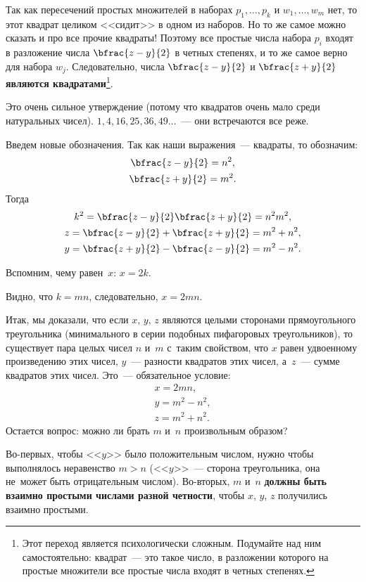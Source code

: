 Так как пересечений простых множителей в наборах $p_1,\dots,p_k$ и $w_1,\dots,w_m$ нет,
то этот квадрат целиком <<сидит>> в одном из наборов. Но то же самое можно сказать и про все прочие
квадраты! Поэтому все простые числа набора $p_i$ входят в разложение числа $\bfrac{z-y}{2}$ в четных
степенях, и то же самое верно для набора $w_j$. Следовательно, числа $\bfrac{z-y}{2}$ и
$\bfrac{z+y}{2}$ \textbf{являются квадратами}\footnote{Этот переход является психологически
сложным. Подумайте над ним самостоятельно: квадрат~--- это такое число, в разложении которого на
простые множители все простые числа входят в четных степенях.}.

Это очень сильное утверждение (потому что квадратов очень мало среди натуральных чисел). $1, 4, 16, 25, 36, 49 \ldots$~---
они встречаются все реже.

Введем новые обозначения. Так как наши выражения~--- квадраты, то обозначим:
\begin{gather*}
\bfrac{z-y}{2}=n^{2},\\
\bfrac{z+y}{2}=m^{2}.
\end{gather*}
Тогда
\begin{gather*}
k^{2}=\bfrac{z-y}{2}\bfrac{z+y}{2}=n^{2}m^{2},\\
z=\bfrac{z-y}{2}+\bfrac{z+y}{2}=m^{2}+n^{2},\\
y=\bfrac{z+y}{2}-\bfrac{z-y}{2}=m^{2}-n^{2}.
\end{gather*}

Вспомним, чему равен~$x$: $x=2k$.

Видно, что $k=mn$, следовательно, $x=2mn$.

Итак, мы доказали, что если $x$, $y$, $z$ являются целыми сторонами прямоугольного треугольника (минимального в серии подобных пифагоровых треугольников), то
существует пара целых чисел $n$ и~$m$ с~таким свойством, что $x$ равен удвоенному произведению этих
чисел, $y$~--- разности квадратов этих чисел, а~$z$~--- сумме квадратов этих чисел. Это~---
обязательное условие:
\begin{gather*}
x=2mn,\\
y=m^{2}-n^{2},\\
z=m^{2}+n^{2}.
\end{gather*}
Остается вопрос: можно ли брать $m$ и~$n$ произвольным образом?

Во-первых, чтобы <<$y$>> было положительным числом, нужно чтобы выполнялось неравенство $m>n$ (<<$y$>>~--- сторона
треугольника, она не~может быть отрицательным числом). Во-вторых, $m$ и~$n$ \textbf{должны быть взаимно простыми числами разной
четности}, чтобы $x$, $y$, $z$ получились взаимно простыми.

